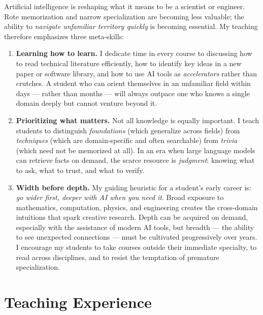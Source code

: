 \documentclass[12pt, a4paper]{article}
\begin{document}
Artificial intelligence is reshaping what it means to be a scientist or
engineer.
Rote memorization and narrow specialization are becoming less valuable;
the ability to \emph{navigate unfamiliar territory quickly} is becoming
essential.
My teaching therefore emphasizes three meta-skills:

\begin{enumerate}
  \item \textbf{Learning how to learn.}
    I dedicate time in every course to discussing how to read technical
    literature efficiently, how to identify key ideas in a new paper or
    software library, and how to use AI tools as \emph{accelerators}
    rather than crutches.
    A student who can orient themselves in an unfamiliar field within days ---
    rather than months --- will always outpace one who knows a single
    domain deeply but cannot venture beyond it.

  \item \textbf{Prioritizing what matters.}
    Not all knowledge is equally important.
    I teach students to distinguish \emph{foundations} (which generalize
    across fields) from \emph{techniques} (which are domain-specific and
    often searchable) from \emph{trivia} (which need not be memorized at all).
    In an era when large language models can retrieve facts on demand,
    the scarce resource is \emph{judgment}: knowing what to ask, what to trust,
    and what to verify.

  \item \textbf{Width before depth.}
    My guiding heuristic for a student's early career is: \emph{go wider
    first, deeper with AI when you need it}.
    Broad exposure to mathematics, computation, physics, and engineering creates
    the cross-domain intuitions that spark creative research.
    Depth can be acquired on demand, especially with the assistance of modern
    AI tools, but breadth --- the ability to see unexpected connections ---
    must be cultivated progressively over years.
    I encourage my students to take courses outside their immediate specialty,
    to read across disciplines, and to resist the temptation of premature
    specialization.
\end{enumerate}

\section{Teaching Experience}
\end{document}
